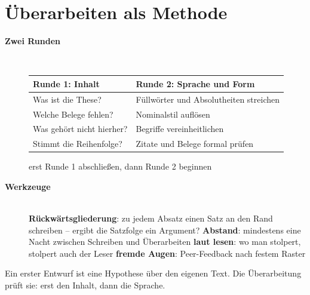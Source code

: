 \section{Überarbeiten als Methode}
\begin{description}
\item[{\rot\bf Zwei Runden}]~\\[-\lblskip]
\begin{center}\nsl{\small}
\begin{tabular}{p{}p{}}
\toprule
\textbf{Runde 1: Inhalt} & \textbf{Runde 2: Sprache und Form} \\
\midrule
Was ist die These? & Füllwörter und Absolutheiten streichen \\
Welche Belege fehlen? & Nominalstil auflösen \\
Was gehört nicht hierher? & Begriffe vereinheitlichen \\
Stimmt die Reihenfolge? & Zitate und Belege formal prüfen \\
\bottomrule
\end{tabular}
\end{center}
\bi
  \ite erst Runde 1 abschließen, dann Runde 2 beginnen
\ei
\os{\newpage}

\item[{\rot\bf Werkzeuge}]~\\[-\lblskip]
\bi
  \ite \textbf{Rückwärtsgliederung}: zu jedem Absatz einen Satz an den Rand
    schreiben -- ergibt die Satzfolge ein Argument?
  \ite \textbf{Abstand}: mindestens eine Nacht zwischen Schreiben und
    Überarbeiten
  \ite \textbf{laut lesen}: wo man stolpert, stolpert auch der Leser
  \ite \textbf{fremde Augen}: Peer-Feedback nach festem Raster
\ei
\os{\newpage}
\end{description}

\begin{merkbox}
Ein erster Entwurf ist eine Hypothese über den eigenen Text. Die
Überarbeitung prüft sie: erst den Inhalt, dann die Sprache.
\end{merkbox}
\os{\newpage}

